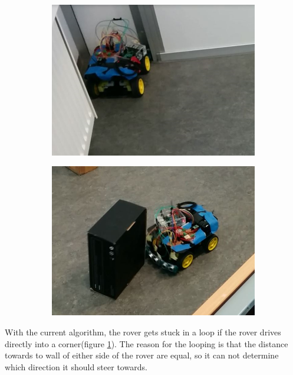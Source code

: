 \begin{figure}[H]
	\centering
	\begin{subfigure}[H]{0.4\textwidth}
		\includegraphics[width=\textwidth]{images/test-stuckincorner.jpg}
		\label{fig:corner}
	\end{subfigure}%
	\quad
	\begin{subfigure}[H]{0.4\textwidth}
		\includegraphics[width=\textwidth]{images/test-badmeasuringangle.jpg}
		\label{fig:badangle}
	\end{subfigure}
\end{figure}

With the current algorithm, the rover gets stuck in a loop if the rover drives directly into a corner(figure \ref{fig:corner}). The reason for the looping is that the distance towards to wall of either side of the rover are equal, so it can not determine which direction it should steer towards.

